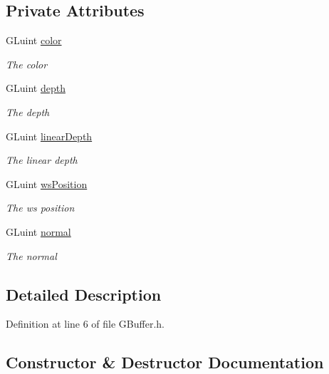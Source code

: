 \subsection*{Private Attributes}
\begin{DoxyCompactItemize}
\item 
G\+Luint \hyperlink{class_g_buffer_ae3e81231e8b1c4009c185b6e10e27a00}{color}
\begin{DoxyCompactList}\small\item\em The color \end{DoxyCompactList}\item 
G\+Luint \hyperlink{class_g_buffer_a2614dc7c37735282d8b86133c816bfd8}{depth}
\begin{DoxyCompactList}\small\item\em The depth \end{DoxyCompactList}\item 
G\+Luint \hyperlink{class_g_buffer_a2833d3d68f1ee08aa227f9ce6f5ac935}{linear\+Depth}
\begin{DoxyCompactList}\small\item\em The linear depth \end{DoxyCompactList}\item 
G\+Luint \hyperlink{class_g_buffer_a05c0bc927dc2295add2ef8e50e160862}{ws\+Position}
\begin{DoxyCompactList}\small\item\em The ws position \end{DoxyCompactList}\item 
G\+Luint \hyperlink{class_g_buffer_a4802469ac9b39db3eb445ee8161a2d40}{normal}
\begin{DoxyCompactList}\small\item\em The normal \end{DoxyCompactList}\end{DoxyCompactItemize}


\subsection{Detailed Description}


Definition at line 6 of file G\+Buffer.\+h.



\subsection{Constructor \& Destructor Documentation}
